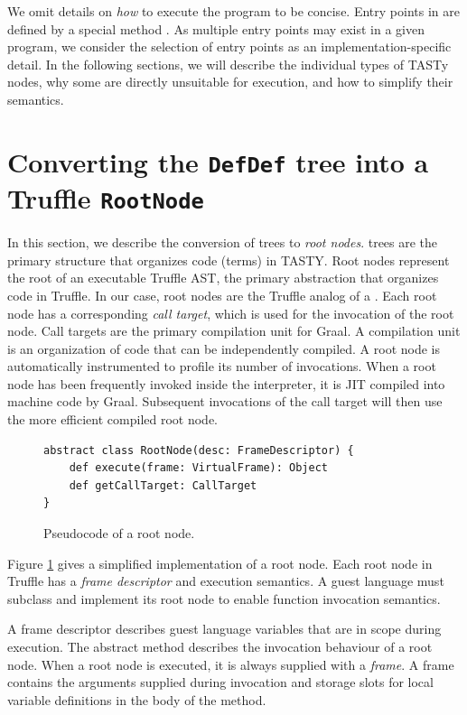 We omit details on \textit{how} to execute the program to be concise.
Entry points in  are defined by a special method .
As multiple entry points may exist in a given program, we consider the selection of entry points as an implementation-specific detail.
In the following sections, we will describe the individual types of TASTy nodes, why some are directly unsuitable for execution, and how to simplify their semantics.

\section{Converting the \texttt{DefDef} tree into a Truffle \texttt{RootNode}}
\label{impl:subsection:defdef}

In this section, we describe the conversion of  trees to \textit{root nodes}.
 trees are the primary structure that organizes code (terms) in TASTY.
Root nodes represent the root of an executable Truffle AST, the primary abstraction that organizes code in Truffle.
In our case, root nodes are the Truffle analog of a .
Each root node has a corresponding \textit{call target}, which is used for the invocation of the root node.
Call targets are the primary compilation unit for Graal.
A compilation unit is an organization of code that can be independently compiled.
A root node is automatically instrumented\cite{profiling:atom} to profile its number of invocations. 
When a root node has been frequently invoked inside the interpreter, it is JIT compiled into machine code by Graal.
Subsequent invocations of the call target will then use the more efficient compiled root node.

\begin{figure}[!htb]
\begin{verbatim}
abstract class RootNode(desc: FrameDescriptor) {
	def execute(frame: VirtualFrame): Object
	def getCallTarget: CallTarget
}
\end{verbatim}
\caption{Pseudocode of a root node.}
\label{example:root-node}
\end{figure}

Figure \ref{example:root-node} gives a simplified implementation of a root node.
Each root node in Truffle has a \textit{frame descriptor} and execution semantics.
A guest language must subclass and implement its root node to enable function invocation semantics.

A frame descriptor describes guest language variables that are in scope during execution.
The abstract  method describes the invocation behaviour of a root node.
When a root node is executed, it is always supplied with a \textit{frame}.
A frame contains the arguments supplied during invocation and storage slots for local variable definitions in the body of the method.

